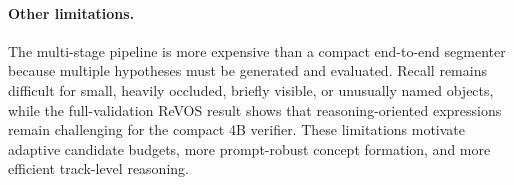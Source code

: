 \paragraph{Other limitations.}
The multi-stage pipeline is more expensive than a compact end-to-end segmenter because multiple hypotheses must be generated and evaluated. Recall remains difficult for small, heavily occluded, briefly visible, or unusually named objects, while the full-validation ReVOS result shows that reasoning-oriented expressions remain challenging for the compact 4B verifier. These limitations motivate adaptive candidate budgets, more prompt-robust concept formation, and more efficient track-level reasoning.
